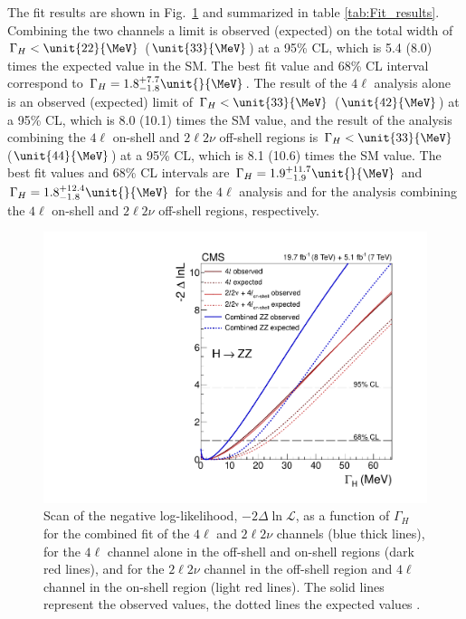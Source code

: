 The fit results are shown in Fig.~\ref{fig:finalplot} and summarized in table \ref{tab:Fit_results}.
Combining the two channels a limit is observed (expected) on the total width of $\Gamma_{H} < \unit{22}{\MeV}$
($\unit{33}{\MeV}$) at a 95\% CL, which is 5.4 (8.0) times the expected value in the SM.
The best fit value and 68\% CL interval correspond to $\Gamma_{H} = 1.8^{+7.7}_{-1.8}\unit{}{\MeV}$. The
result of the $4\ell$ analysis alone is an observed (expected) limit of $\Gamma_{H} < \unit{33}{\MeV}$
($\unit{42}{\MeV}$) at a 95\% CL, which is 8.0 (10.1) times the SM value, and the result of the
analysis combining the $4\ell$ on-shell and $2\ell 2\nu$ off-shell regions is $\Gamma_{H} < \unit{33}{\MeV}$
($\unit{44}{\MeV}$) at a 95\% CL, which is 8.1 (10.6) times the SM value.
The best fit values and 68\% CL intervals are $\Gamma_{H} = 1.9^{+11.7}_{-1.9}\unit{}{\MeV}$ and
$\Gamma_{H} = 1.8^{+12.4}_{-1.8}\unit{}{\MeV}$ for the $4\ell$ analysis and for the analysis combining the $4\ell$
on-shell and $2\ell 2\nu$ off-shell regions, respectively.
\begin{figure}
\centering
\includegraphics[width=0.75\linewidth]{HZZ_Width/fig5_new.pdf}
\caption[Scan of the negative log-likelihood, $-2 \Delta \ln\mathcal{L}$, as a
function of $\Gamma_{H}$ for the combined fit of the $4\ell$ and
$2\ell 2\nu$ channels (blue thick lines), for the $4\ell$ channel alone in the
off-shell and on-shell regions (dark red lines), and for the $2\ell 2\nu$
channel in the off-shell region and $4\ell$ channel in the on-shell region
(light red lines). The solid lines represent the observed values, the dotted lines
the expected values]{
Scan of the negative log-likelihood, $-2 \Delta \ln\mathcal{L}$, as a
function of $\Gamma_{H}$ for the combined fit of the $4\ell$ and
$2\ell 2\nu$ channels (blue thick lines), for the $4\ell$ channel alone in the
off-shell and on-shell regions (dark red lines), and for the $2\ell 2\nu$
channel in the off-shell region and $4\ell$ channel in the on-shell region
(light red lines). The solid lines represent the observed values, the dotted lines
the expected values \cite{Khachatryan:2014iha}.
}
\label{fig:finalplot}
\end{figure}

